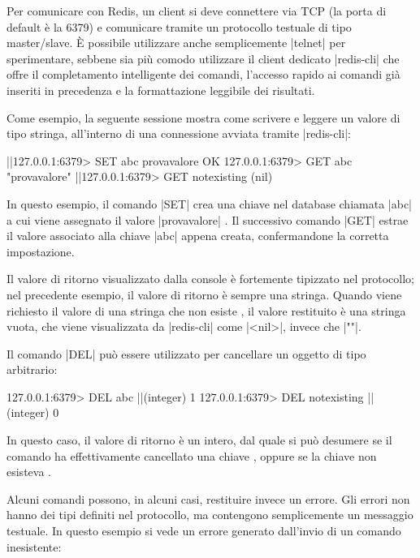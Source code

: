 Per comunicare con Redis, un client si deve connettere via TCP (la porta di default è la \num{6379})
e comunicare tramite un protocollo testuale di tipo master/slave. È possibile utilizzare anche
semplicemente \cverb|telnet| per sperimentare, sebbene sia più comodo utilizzare il client dedicato
\cverb|redis-cli| che offre il completamento intelligente dei comandi, l'accesso rapido ai comandi
già inseriti in precedenza e la formattazione leggibile dei risultati.

Come esempio, la seguente sessione mostra come scrivere e leggere un valore di tipo
stringa, all'interno di una connessione avviata tramite \cverb|redis-cli|:

\begin{commentedsource}[style=redis]
|\lnote|127.0.0.1:6379> SET abc provavalore
OK
127.0.0.1:6379> GET abc
"provavalore"
|\lnote|127.0.0.1:6379> GET notexisting
(nil)
\end{commentedsource}

In questo esempio, il comando \cverb|SET| crea una chiave nel database chiamata \cverb|abc| a cui
viene assegnato il valore \cverb|provavalore| . Il successivo comando \cverb|GET| estrae
il valore associato alla chiave \cverb|abc| appena creata, confermandone la corretta impostazione.

Il valore di ritorno visualizzato dalla console è fortemente tipizzato nel protocollo;
nel precedente esempio, il valore di ritorno è sempre una stringa. Quando viene
richiesto il valore di una stringa che non esiste , il valore restituito
è una stringa vuota, che viene visualizzata da \cverb|redis-cli| come \cverb|<nil>|,
invece che \cverb|""|.

Il comando \cverb|DEL| può essere utilizzato per cancellare un oggetto di tipo
arbitrario:

\begin{commentedsource}[style=redis]
127.0.0.1:6379> DEL abc
|\lnote|(integer) 1
127.0.0.1:6379> DEL notexisting
|\lnote|(integer) 0
\end{commentedsource}

In questo caso, il valore di ritorno è un intero, dal quale si può desumere se il comando ha
effettivamente cancellato una chiave , oppure se la chiave non esisteva .

Alcuni comandi possono, in alcuni casi, restituire invece un errore. Gli errori non hanno dei
tipi definiti nel protocollo, ma contengono semplicemente un messaggio testuale. In questo
esempio si vede un errore generato dall'invio di un comando inesistente:

